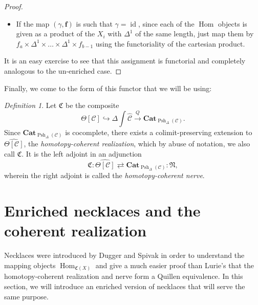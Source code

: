 \documentclass{amsart}
\numberwithin{equation}{section}
\theoremstyle{plain}   %
\theoremstyle{remark}
\newtheorem{defn}[subsection]{Definition}
\theoremstyle{plain}
\DeclareMathOperator{\id}{id}
\DeclareMathOperator{\Psh}{Psh}
\newcommand{\Cat}{\ensuremath{\mathbf{Cat}}}
\DeclareMathOperator{\Hom}{Hom}
\newcommand{\psh}[1]{\ensuremath{\widehat{#1}}}
\newcommand{\C}{\ensuremath{\mathcal{C}}}
\newcommand{\cellset}{\ensuremath{\widehat{\Theta[\mathcal{C}]}}}
\begin{document}
\begin{proof}
\begin{itemize}
		\item If the map \((\gamma,\mathbf{f})\) is such that \(\gamma=\id\), since each of the \(\Hom\) objects is given as a product of the \(X_i\) with \(\Delta^1\) of the same length, just map them by \(f_a\times\Delta^1\times \dots \times\Delta^1 \times f_{b-1}\) using the functoriality of the cartesian product.
	\end{itemize}
	It is an easy exercise to see that this assignment is functorial and completely analogous to the un-enriched case.
\end{proof}

Finally, we come to the form of this functor that we will be using:

\begin{defn} Let \(\mathfrak{C}\) be the composite \[\Theta[\C]\hookrightarrow\Delta\int \psh{\C} \xrightarrow{Q} \Cat_{\Psh_\Delta(\C)}.\] Since \(\Cat_{\Psh_\Delta(\C)}\) is cocomplete, there exists a colimit-preserving extension to \(\cellset\), the \emph{homotopy-coherent realization}, which by abuse of notation, we also call \(\mathfrak{C}\).  It is the left adjoint in an adjunction \[\mathfrak{C}:\cellset\rightleftarrows \Cat_{\Psh_\Delta(\C)}:\mathfrak{N},\]  wherein the right adjoint is called the \emph{homotopy-coherent nerve}.
\end{defn}

\section{Enriched necklaces and the coherent realization}
Necklaces were introduced by Dugger and Spivak in order to understand the mapping objects \(\Hom_{\mathfrak{C}(X)}\) and give a much easier proof than Lurie's that the homotopy-coherent realization and nerve form a Quillen equivalence.  In this section, we will introduce an enriched version of necklaces that will serve the same purpose.
\end{document}
